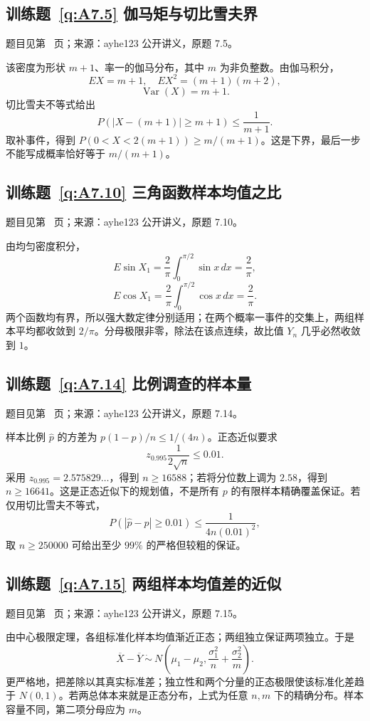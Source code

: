 \documentclass[UTF8,12pt,a4paper,fontset=fandol]{ctexbook}
\begin{document}
\subsection*{训练题~\ref{q:A7.5} 伽马矩与切比雪夫界}\label{a:A7.5}{\small 题目见第~\pageref{q:A7.5} 页；来源：ayhe123 公开讲义，原题 7.5。}
\begin{solve}该密度为形状 $m+1$、率一的伽马分布，其中 $m$ 为非负整数。由伽马积分，\[EX=m+1,\quad EX^2=(m+1)(m+2),\]\[\operatorname{Var}(X)=m+1.\]切比雪夫不等式给出\[P(|X-(m+1)|\ge m+1)\le\frac1{m+1}.\]取补事件，得到 $P(0<X<2(m+1))\ge m/(m+1)$。这是下界，最后一步不能写成概率恰好等于 $m/(m+1)$。\end{solve}

\subsection*{训练题~\ref{q:A7.10} 三角函数样本均值之比}\label{a:A7.10}{\small 题目见第~\pageref{q:A7.10} 页；来源：ayhe123 公开讲义，原题 7.10。}
\begin{solve}由均匀密度积分，\[E\sin X_1=\frac2\pi\int_0^{\pi/2}\sin x\,dx=\frac2\pi,\]\[E\cos X_1=\frac2\pi\int_0^{\pi/2}\cos x\,dx=\frac2\pi.\]两个函数均有界，所以强大数定律分别适用；在两个概率一事件的交集上，两组样本平均都收敛到 $2/\pi$。分母极限非零，除法在该点连续，故比值 $Y_n$ 几乎必然收敛到 $1$。\end{solve}

\subsection*{训练题~\ref{q:A7.14} 比例调查的样本量}\label{a:A7.14}{\small 题目见第~\pageref{q:A7.14} 页；来源：ayhe123 公开讲义，原题 7.14。}
\begin{solve}样本比例 $\widehat p$ 的方差为 $p(1-p)/n\le1/(4n)$。正态近似要求\[z_{0.995}\frac{1}{2\sqrt n}\le0.01.\]采用 $z_{0.995}=2.575829\ldots$，得到 $n\ge16588$；若将分位数上调为 $2.58$，得到 $n\ge16641$。这是正态近似下的规划值，不是所有 $p$ 的有限样本精确覆盖保证。若仅用切比雪夫不等式，\[P(|\widehat p-p|\ge0.01)\le\frac{1}{4n(0.01)^2},\]取 $n\ge250000$ 可给出至少 $99\%$ 的严格但较粗的保证。\end{solve}

\subsection*{训练题~\ref{q:A7.15} 两组样本均值差的近似}\label{a:A7.15}{\small 题目见第~\pageref{q:A7.15} 页；来源：ayhe123 公开讲义，原题 7.15。}
\begin{solve}由中心极限定理，各组标准化样本均值渐近正态；两组独立保证两项独立。于是\[\overline X-\overline Y\ \dot\sim\ N\left(\mu_1-\mu_2,\frac{\sigma_1^2}{n}+\frac{\sigma_2^2}{m}\right).\]更严格地，把差除以其真实标准差；独立性和两个分量的正态极限使该标准化差趋于 $N(0,1)$。若两总体本来就是正态分布，上式为任意 $n,m$ 下的精确分布。样本容量不同，第二项分母应为 $m$。\end{solve}
\end{document}
